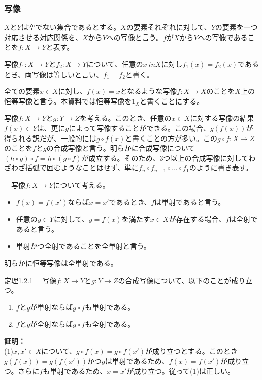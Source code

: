 \documentclass[dvipdfmx, 9pt, a4paper]{jsarticle}
\numberwithin{equation}{subsection}
\begin{document}
\subsubsection{写像}
$X$と$Y$は空でない集合であるとする。$X$の要素それぞれに対して、$Y$の要素を一つ対応させる対応関係を、$X$から$Y$への写像と言う。$f$が$X$から$Y$への写像であることを$f:X \to Y$と表す。\par
写像$f_1:X \to Y$と$f_2:X \to Y$について、任意の$x \ in X$に対し$f_1(x)=f_2(x)$であるとき、両写像は等しいと言い、$f_1=f_2$と書く。\par
全ての要素$x \in X$に対し、$f(x)=x$となるような写像$f:X \to X$のことを$X$上の恒等写像と言う。本資料では恒等写像を$1_X$と書くことにする。\par
写像$f:X \to Y$と$g:Y \to Z$を考える。このとき、任意の$x \in X$に対する写像の結果$f(x) \in Y$は、更に$g$によって写像することができる。この場合、$g(f(x))$が得られる訳だが、一般的には$g \circ f(x)$と書くことの方が多い。この$g \circ f:X \to Z$のことを$f$と$g$の合成写像と言う。明らかに合成写像について$(h \circ g)\circ f=h\circ (g \circ f)$が成立する。そのため、3つ以上の合成写像に対してわざわざ括弧で囲むようなことはせず、単に$f_n \circ f_{n-1} \circ ... \circ f_1$のように書き表す。
\begin{tcolorbox}[title=単射、全射]
　写像$f:X \to Y$について考える。
\begin{itemize}
\item $f(x)=f(x')$ならば$x=x'$であるとき、$f$は単射であると言う。
\item 任意の$y \in Y$に対して、$y=f(x)$を満たす$x \in X$が存在する場合、$f$は全射であると言う。
\item 単射かつ全射であることを全単射と言う。
\end{itemize}
\end{tcolorbox}\par
明らかに恒等写像は全単射である。
\begin{itembox}[l]{定理1.2.1}
　写像$f:X \to Y$と$g:Y \to Z$の合成写像について、以下のことが成り立つ。
\begin{enumerate}
\item $f$と$g$が単射ならば$g \circ f$も単射である。
\item $f$と$g$が全射ならば$g \circ f$も全射である。
\end{enumerate}
\end{itembox}
{\bf 証明：}\\
(1)$x, x' \in X$について、$g \circ f(x)=g \circ f(x')$が成り立つとする。このとき$g(f(x))=g(f(x'))$かつ$g$は単射であるため、$f(x)=f(x')$が成り立つ。さらに$f$も単射であるため、$x=x'$が成り立つ。従って(1)は正しい。\\
\end{document}
